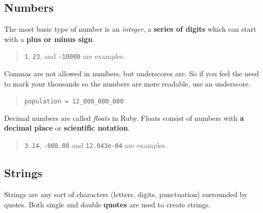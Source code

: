 \documentclass[10pt,twoside]{report}
\begin{document}
\subsection{Numbers}



The most basic type of number is an {\em integer}, a {\bf series of
  digits} which can start with a {\bf plus or minus sign}.

\begin{quote}
\lstinline[breaklines=true]|1|, \lstinline[breaklines=true]|23|, and
\lstinline[breaklines=true]|-10000| are examples.\end{quote}


Commas are not allowed in numbers, but underscores are.  So if you
feel the need to mark your thousands so the numbers are more readable,
use an underscore.

\begin{quote}
\lstinline[breaklines=true]|population = 12_000_000_000|\end{quote}


Decimal numbers are called {\em floats} in Ruby.  Floats consist of
numbers with {\bf a decimal place} or {\bf scientific notation}.

\begin{quote}
\lstinline[breaklines=true]|3.14|,
\lstinline[breaklines=true]|-808.08| and
\lstinline[breaklines=true]|12.043e-04| are examples.\end{quote}





\subsection{Strings}



Strings are any sort of characters (letters, digits, punctuation)
surrounded by quotes.  Both single and double {\bf quotes} are used to
create strings.
\end{document}
